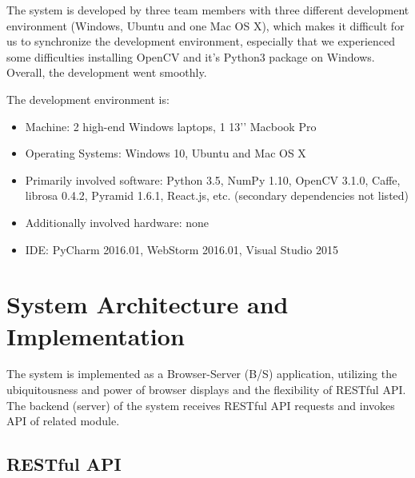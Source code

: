 \documentclass{report}
\begin{document}
The system is developed by three team members with three different development environment (Windows, Ubuntu and one Mac OS X), which makes it difficult for us to synchronize the development environment, especially that we experienced some difficulties installing OpenCV and it’s Python3 package on Windows. Overall, the development went smoothly.

The development environment is:
\begin{itemize}
  \item Machine: 2 high-end Windows laptops, 1 13’’ Macbook Pro
  \item Operating Systems: Windows 10, Ubuntu and Mac OS X
  \item Primarily involved software: Python 3.5, NumPy 1.10, OpenCV 3.1.0, Caffe, librosa 0.4.2, Pyramid 1.6.1, React.js, etc. (secondary dependencies not listed)
  \item Additionally involved hardware: none
  \item IDE: PyCharm 2016.01, WebStorm 2016.01, Visual Studio 2015
\end{itemize}

\section{System Architecture and Implementation}

The system is implemented as a Browser-Server (B/S) application, utilizing the ubiquitousness and power of browser displays and the flexibility of RESTful API. The backend (server) of the system receives RESTful API requests and invokes API of related module.

\subsection{RESTful API}
\end{document}
